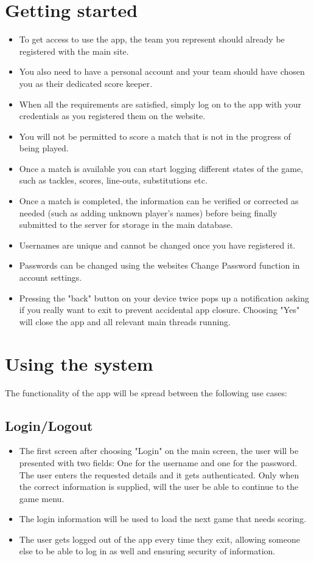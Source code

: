\documentclass[hidelinks,a4paper,12pt]{article}
\begin{document}
\section{Getting started}
	\begin {itemize}
		\item To get access to use the app, the team you represent should already be registered with the main site.
		\item You also need to have a personal account and your team should have chosen you as their dedicated score keeper.
		\item When all the requirements are satisfied, simply log on to the app with your credentials as you registered them on the website.
		\item You will not be permitted to score a match that is not in the progress of being played.
		\item Once a match is available you can start logging different states of the game, such as tackles, scores, line-outs, substitutions etc.
		\item Once a match is completed, the information can be verified or corrected as needed (such as adding unknown player's names) before being finally submitted to the server for storage in the main database.
		\item Usernames are unique and cannot be changed once you have registered it.
		\item Passwords can be changed using the websites Change Password function in account settings.
		\item Pressing the "back" button on your device twice pops up a notification asking if you really want to exit to prevent accidental app closure. Choosing "Yes" will close the app and all relevant main threads running.
	\end{itemize}

\newpage

\section{Using the system}
The functionality of the app will be spread between the following use cases:

	\subsection{Login/Logout}
		\begin {itemize}
			\item The first screen after choosing "Login" on the main screen, the user will be presented with two fields: One for the username and one for the password. The user enters the requested details and it gets authenticated. Only when the correct information is supplied, will the user be able to continue to the game menu.
			\item The login information will be used to load the next game that needs scoring.
			\item The user gets logged out of the app every time they exit, allowing someone else to be able to log in as well and ensuring security of information.
		\end{itemize}
		
\end{document}
